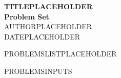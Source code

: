 \documentclass[11pt,a4paper]{article}
\begin{document}
\thispagestyle{empty}
\begin{center}
  \vspace*{2cm}
  \Huge \textbf{TITLEPLACEHOLDER} \\[0.5em]
  \Large \textbf{Problem Set} \\[2cm]
  \Large AUTHORPLACEHOLDER \\[1cm]
  \large DATEPLACEHOLDER \\[4cm]
  \hspace*{2cm}\parbox{0.3\textwidth}{
    PROBLEMSLISTPLACEHOLDER
  }
\end{center}
\clearpage

\setcounter{page}{1}

PROBLEMSINPUTS
\end{document}
